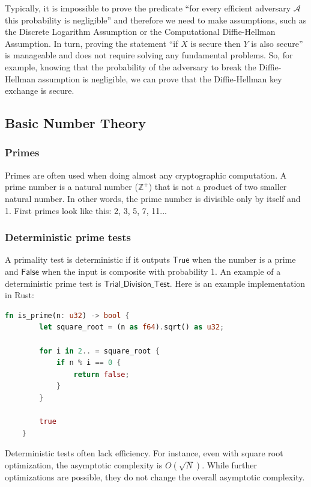 \documentclass[../lecture-notes.tex]{subfiles}
\begin{document}
Typically, it is impossible to prove the predicate ``for every efficient adversary $\mathcal{A}$ this probability is negligible'' and therefore we need to make assumptions, such as the Discrete Logarithm Assumption or the Computational Diffie-Hellman Assumption. In turn, proving the statement ``if $X$ is secure then $Y$ is also secure'' is manageable and does not require solving any fundamental problems. So, for example,
knowing that the probability of the adversary to break the Diffie-Hellman assumption is negligible, we can prove that the Diffie-Hellman key exchange is secure. 

\subsection{Basic Number Theory}

\subsubsection{Primes}

Primes are often used when doing almost any cryptographic computation. A prime number is a natural number ($\mathbb{Z}^{+}$) that is not a product
of two smaller natural number. In other words, the prime number is divisible only by itself and 1. First primes look like this: 2, 3, 5, 7, 11...

\subsubsection{Deterministic prime tests}

A primality test is deterministic if it outputs $\mathsf{True}$ when the number is a prime and $\mathsf{False}$ when the input is composite with probability 1.
An example of a deterministic prime test is $\mathsf{Trial\_Division\_Test}$. Here is an example implementation in Rust: 

\begin{lstlisting}[language=Rust]
    fn is_prime(n: u32) -> bool {
        let square_root = (n as f64).sqrt() as u32;

        for i in 2.. = square_root {
            if n % i == 0 {
                return false;
            }
        }

        true
    }
\end{lstlisting}

Deterministic tests often lack efficiency. For instance, even with square root optimization, the asymptotic complexity is $O(\sqrt{N})$. 
While further optimizations are possible, they do not change the overall asymptotic complexity.
\end{document}
